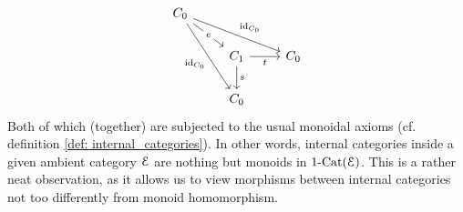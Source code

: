\begin{remark}
$$\begin{tikzcd}
                        	{C_0} \\
                        	& {C_1} & {C_0} \\
                        	& {C_0}
                        	\arrow["s", from=2-2, to=3-2]
                        	\arrow["t"', from=2-2, to=2-3]
                        	\arrow["e"{description}, from=1-1, to=2-2]
                        	\arrow["{\id_{C_0}}"', from=1-1, to=3-2]
                        	\arrow["{\id_{C_0}}", from=1-1, to=2-3]
                        \end{tikzcd}
                    $$
                Both of which (together) are subjected to the usual monoidal axioms (cf. definition \ref{def: internal_categories}). In other words, internal categories inside a given ambient category $\mathcal{E}$ are nothing but monoids in $1\text{-}\mathrm{Cat}(\mathcal{E})$. This is a rather neat observation, as it allows us to view morphisms between internal categories not too differently from monoid homomorphism. 
            \end{remark}
            
